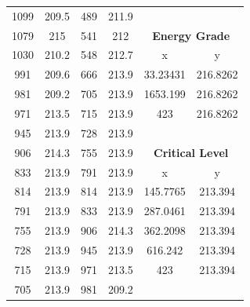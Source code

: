 \begin{center}
\begin{tabular}{|cc||cc||cc|}
    1099     & 209.5                     & 489  & 211.9                          &          &                                     \\
    1079     & 215                       & 541  & 212                            & \multicolumn{2}{c|}{\textbf{Energy Grade }}    \\ 
    \cline{5-6}
    1030     & 210.2                     & 548  & 212.7                          & x        & y                                   \\
    991      & 209.6                     & 666  & 213.9                          & 33.23431 & 216.8262                            \\
    981      & 209.2                     & 705  & 213.9                          & 1653.199 & 216.8262                            \\
    971      & 213.5                     & 715  & 213.9                          & 423      & 216.8262                            \\
    945      & 213.9                     & 728  & 213.9                          &          &                                     \\
    906      & 214.3                     & 755  & 213.9                          & \multicolumn{2}{c|}{\textbf{Critical Level }}  \\ 
    \cline{5-6}
    833      & 213.9                     & 791  & 213.9                          & x        & y                                   \\
    814      & 213.9                     & 814  & 213.9                          & 145.7765 & 213.394                             \\
    791      & 213.9                     & 833  & 213.9                          & 287.0461 & 213.394                             \\
    755      & 213.9                     & 906  & 214.3                          & 362.2098 & 213.394                             \\
    728      & 213.9                     & 945  & 213.9                          & 616.242  & 213.394                             \\
    715      & 213.9                     & 971  & 213.5                          & 423      & 213.394                             \\
    705      & 213.9                     & 981  & 209.2                          &          &                                     \\

\end{tabular}
\end{center}
